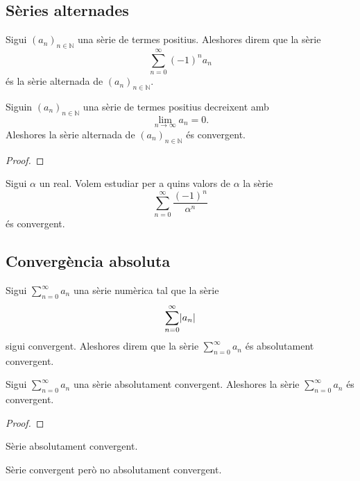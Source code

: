 \documentclass[../Apunts.tex]{subfiles}
\begin{document}
	\subsection{Sèries alternades}
	\begin{definition}
		\label{def:sèrie alternada}
		Sigui \((a_{n})_{n\in\mathbb{N}}\) una sèrie de termes positius. Aleshores direm que la sèrie
		\[\sum_{n=0}^{\infty}(-1)^{n}a_{n}\]
		és la sèrie alternada de \((a_{n})_{n\in\mathbb{N}}\).
	\end{definition}
	\begin{theorem}
		\label{thm:criteri de Leibniz per sèries alternades}
		Siguin \((a_{n})_{n\in\mathbb{N}}\) una sèrie de termes positius decreixent amb 
		\[\lim_{n\to\infty}a_{n}=0.\]
		Aleshores la sèrie alternada de \((a_{n})_{n\in\mathbb{N}}\) és convergent.
		\begin{proof}
		\end{proof}
	\end{theorem}
	\begin{example}
		Sigui \(\alpha\) un real. Volem estudiar per a quins valors de \(\alpha\) la sèrie
		\[\sum_{n=0}^{\infty}\frac{(-1)^{n}}{\alpha^{n}}\]
		és convergent.
		\begin{solution}
		\end{solution}
	\end{example}
	\subsection{Convergència absoluta}
	\begin{definition}
		\label{def:convergència absoluta d'una sèrie}
		Sigui \(\sum_{n=0}^{\infty}a_{n}\) una sèrie numèrica tal que la sèrie
		\[\sum_{n=0}^{\infty}\abs{a_{n}}\]
		sigui convergent. Aleshores direm que la sèrie \(\sum_{n=0}^{\infty}a_{n}\) és absolutament convergent.
	\end{definition}
	\begin{proposition}
		\label{prop:si una sèrie és absolutament convegent és convergent}
		Sigui \(\sum_{n=0}^{\infty}a_{n}\) una sèrie absolutament convergent. Aleshores la sèrie \(\sum_{n=0}^{\infty}a_{n}\) és convergent.
		\begin{proof}
		\end{proof}
	\end{proposition}
	\begin{example}
		Sèrie absolutament convergent.
		\begin{solution}
		\end{solution}
	\end{example}
	\begin{example}
		Sèrie convergent però no absolutament convergent.
		\begin{solution}
		\end{solution}
	\end{example}
\end{document}

